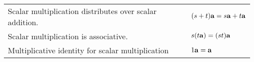 \documentclass[oneside]{memoir}
\begin{document}
\begin{definition}
\begin{tabularx}{\textwidth}{lX}
Scalar multiplication distributes over scalar addition. & $(s + t)\mathbf{a} =
s\mathbf{a} + t\mathbf{a}$
\\

Scalar multiplication is associative. & $s(t\mathbf{a}) = (st) \mathbf{a}$ \\

Multiplicative identity for scalar multiplication & $1\mathbf{a} = \mathbf{a}$ \\
\bottomrule
\end{tabularx}  
\end{definition}


\end{document}
